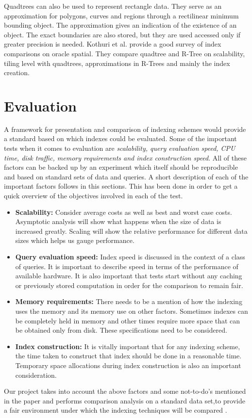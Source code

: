 \documentclass{sig-alternate-05-2015}
\begin{document}
Quadtrees can also be used to represent rectangle data. They serve as an approximation for polygons, curves and regions through a rectilinear minimum bounding object. The approximation gives an indication of the existence of an object. The exact boundaries are also stored, but they are used accessed only if greater precision is needed. Kothuri et al.  \cite{kothuri2002quadtree} provide a good survey of index comparisons on oracle spatial. They compare quadtree and R-Tree on scalability, tiling level with quadtrees, approximations in R-Trees and mainly the index creation.\cite{kothuri2002quadtree} 



\section{Evaluation}
A framework for presentation and comparison of indexing schemes would provide a standard based on which indexes could be evaluated. Some of the important tests when it comes to evaluation are \textit{scalability, query evaluation speed, CPU time, disk traffic, memory requirements and index construction speed}.  All of these factors can be backed up by an experiment which itself should be reproducible and based on standard sets of data and queries. A short description of each of the important factors follows in this sections. This has been done in order to get a quick overview of the objectives involved in each of the test.
\begin{itemize}
\item \textbf{Scalability:} Consider average costs as well as best and worst case costs. Asymptotic analysis will show what happens when the size of data is increased greatly. Scaling will show the relative performance for different data sizes which helps us gauge performance.
\item \textbf{Query evaluation speed:} Index speed is discussed in the context of a class of queries. It is important to describe speed in terms of the performance of available hardware.  It is also important that tests start without any caching or previously stored computation in order for the comparison to remain fair.
\item \textbf{Memory requirements:} There needs to be a mention of how the indexing uses the memory and its memory use on other factors. Sometimes indexes can be completely held in memory and other times require more space that can be obtained only from disk. These specifications need to be considered.
\item \textbf{Index construction:} It is vitally important that for any indexing scheme, the time taken to construct that index should be done in a reasonable time. Temporary space allocations during index construction is also an important consideration. 
\end{itemize}
Our project takes into account the above factors and some not-to-do's mentioned in the paper and performs comparison analysis on a standard data set,to provide a fair environment under which the indexing techniques will be compared \cite{zobel1996guidelines}.
\end{document}
